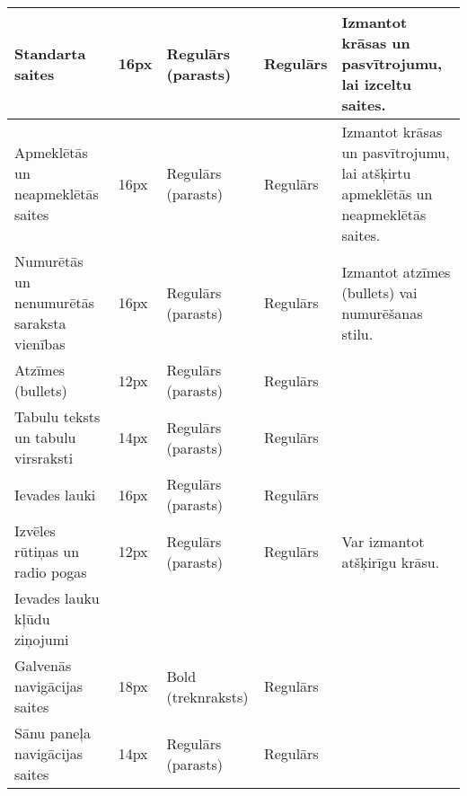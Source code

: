 \begin{tabularx}{\linewidth}{|X|X|X|X|X|}
	Standarta saites                           & 16px            & Regulārs (parasts)          & Regulārs             & Izmantot krāsas un pasvītrojumu, lai izceltu saites.                             \\ \hline
	Apmeklētās un neapmeklētās saites          & 16px            & Regulārs (parasts)          & Regulārs             & Izmantot krāsas un pasvītrojumu, lai atšķirtu apmeklētās un neapmeklētās saites. \\ \hline
	Numurētās un nenumurētās saraksta vienības & 16px            & Regulārs (parasts)          & Regulārs             & Izmantot atzīmes (bullets) vai numurēšanas stilu.                                \\ \hline
	Atzīmes (bullets)                          & 12px            & Regulārs (parasts)          & Regulārs             &                                                                                  \\ \hline
	Tabulu teksts un tabulu virsraksti         & 14px            & Regulārs (parasts)          & Regulārs             &                                                                                  \\ \hline
	Ievades lauki                              & 16px            & Regulārs (parasts)          & Regulārs             &                                                                                  \\ \hline
	Izvēles rūtiņas un radio pogas             & 12px            & Regulārs (parasts)          & Regulārs             & Var izmantot atšķirīgu krāsu.                                                    \\ \hline
	Ievades lauku kļūdu ziņojumi               &                 &                             &                      &                                                                                  \\ \hline
	Galvenās navigācijas saites                & 18px            & Bold (treknraksts)          & Regulārs             &                                                                                  \\ \hline
	Sānu paneļa navigācijas saites             & 14px            & Regulārs (parasts)          & Regulārs             &                                                                                  \\ \hline
\end{tabularx}
